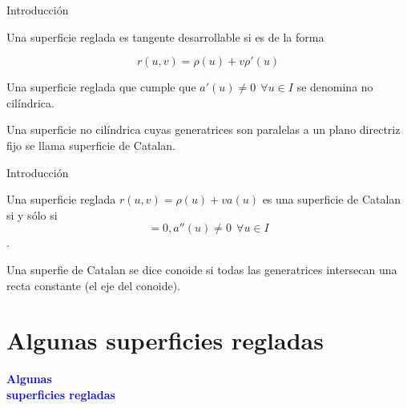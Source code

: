 \documentclass[10pt]{beamer}
\begin{document}
	\begin{frame}{Introducción}
			\begin{defi}
				Una superficie reglada es tangente desarrollable si es de la forma 
				
				\begin{equation}
				r(u,v) = \rho(u) + v \rho'(u)
				\end{equation}
			\end{defi}
			
			\begin{defi}
				Una superficie reglada que cumple que $a'(u) \neq 0 \ \ \forall u \in I$ se denomina no cilíndrica. 
			\end{defi}
			
			\begin{defi}
				Una superficie no cilíndrica cuyas generatrices son paralelas a un plano directriz fijo se llama superficie de Catalan.
			\end{defi}
			
	\end{frame}
	
	\begin{frame}{Introducción}
		\begin{teo}
			Una superficie reglada $r(u,v) = \rho(u) + v a(u)$ es una superficie de Catalan si y sólo si
			\begin{equation}
			[a(u), a'(a), a''(u)] = 0,  a''(u) \neq 0 \ \ \forall u \in I
			\end{equation}.
		\end{teo}
		
		\begin{defi}
			Una superfie de Catalan se dice conoide si todas las generatrices intersecan una recta constante (el eje del conoide).
		\end{defi}
		
	
	\end{frame}
	
	\section{Algunas superficies regladas}
	
	\begin{frame}
		\begin{center}
			\Huge\textbf{\textsf{\textcolor{blue}{Algunas \\ superficies regladas}}}
		\end{center}
	\end{frame}
	
\end{document}
